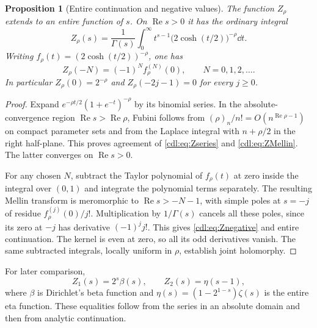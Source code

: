 \documentclass[11pt,letterpaper]{article}
\numberwithin{equation}{section}
\newtheorem{proposition}[theorem]{Proposition}
\theoremstyle{definition}\newtheorem{definition}[theorem]{Definition}
\theoremstyle{remark}\newtheorem{remark}[theorem]{Remark}
\newcommand{\Rea}{\operatorname{Re}}\newcommand{\Ima}{\operatorname{Im}}
\begin{document}
\begin{proposition}[Entire continuation and negative values]
\label{cdl:prop:Z}
The function $Z_\rho$ extends to an entire function of $s$. On
$\Rea s>0$ it has the ordinary integral
\begin{equation}\label{cdl:eq:ZMellin}
 Z_\rho(s)=\frac1{\Gamma(s)}\int_0^\infty
 t^{s-1}\bigl(2\cosh(t/2)\bigr)^{-\rho}\dd t.
\end{equation}
Writing $f_\rho(t)=(2\cosh(t/2))^{-\rho}$, one has
\begin{equation}\label{cdl:eq:Znegative}
 Z_\rho(-N)=(-1)^N f_\rho^{(N)}(0),\qquad N=0,1,2,\ldots.
\end{equation}
In particular $Z_\rho(0)=2^{-\rho}$ and
$Z_\rho(-2j-1)=0$ for every $j\ge0$.
\end{proposition}
\begin{proof}
Expand $e^{-\rho t/2}(1+e^{-t})^{-\rho}$ by its binomial series.
In the absolute-convergence region $\Rea s>\Rea\rho$, Fubini follows
from $(\rho)_n/n!=O(n^{\Rea\rho-1})$ on compact parameter sets and
from the Laplace integral with $n+\rho/2$ in the right half-plane.
This proves agreement of \eqref{cdl:eq:Zseries} and
\eqref{cdl:eq:ZMellin}. The latter converges on $\Rea s>0$.

For any chosen $N$, subtract the Taylor polynomial of $f_\rho(t)$ at
zero inside the integral over $(0,1)$ and integrate the polynomial
terms separately. The resulting Mellin transform is meromorphic to
$\Rea s>-N-1$, with simple poles at $s=-j$ of residue
$f_\rho^{(j)}(0)/j!$. Multiplication by $1/\Gamma(s)$ cancels all these
poles, since its zero at $-j$ has derivative $(-1)^j j!$.
This gives \eqref{cdl:eq:Znegative} and entire continuation. The kernel
is even at zero, so all its odd derivatives vanish. The same subtracted
integrals, locally uniform in $\rho$, establish joint holomorphy.
\end{proof}

For later comparison,
\begin{equation}\label{cdl:eq:Zspecial}
 Z_1(s)=2^s\beta(s),\qquad Z_2(s)=\eta(s-1),
\end{equation}
where $\beta$ is Dirichlet's beta function and
$\eta(s)=(1-2^{1-s})\zeta(s)$ is the entire eta function.
These equalities follow from the series in an absolute domain and then
from analytic continuation.
\end{document}
